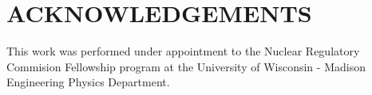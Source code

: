 \documentclass{mc2013}
\begin{document}
\section*{ACKNOWLEDGEMENTS}

This work was performed under appointment to the Nuclear Regulatory
Commision Fellowship program at the University of Wisconsin - Madison
Engineering Physics Department.

\setlength{\baselineskip}{12pt}



\end{document}
